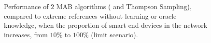 \begin{figure}[!t]
    \hfill
    \caption{Performance of $2$ MAB algorithms (\UCB{} and Thompson Sampling), compared to extreme references without learning or oracle knowledge, when the proportion of smart end-devices in the network increases, from $10\%$ to $100\%$ (limit scenario).}
    \label{fig:41:from10to100}
    \vspace*{-10pt}
\end{figure}

